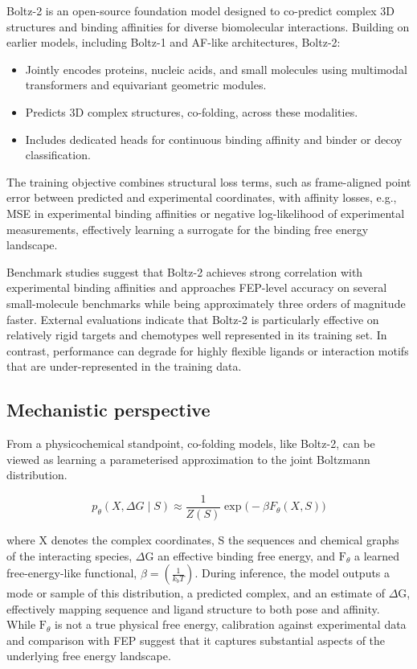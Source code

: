 \documentclass[12pt]{article}
\begin{document}
Boltz-2\cite{CH13_passaro2025boltz2} is an open-source foundation model designed to co-predict complex 3D structures and binding affinities for diverse biomolecular interactions. Building on earlier models, including Boltz-1\cite{CH13_wohlwend2025boltz} and AF-like architectures, Boltz-2:
\begin{itemize}
  \item Jointly encodes proteins, nucleic acids, and small molecules using multimodal transformers and equivariant geometric modules.
  \item Predicts 3D complex structures, co-folding, across these modalities.
  \item Includes dedicated heads for continuous binding affinity and binder or decoy classification.
\end{itemize}
The training objective combines structural loss terms, such as frame-aligned point error between predicted and experimental coordinates, with affinity losses, e.g., MSE in experimental binding affinities or negative log-likelihood of experimental measurements, effectively learning a surrogate for the binding free energy landscape.

Benchmark studies\cite{CH13_passaro2025boltz2,CH13_wan2026reliability} suggest that Boltz-2 achieves strong correlation with experimental binding affinities and approaches FEP-level accuracy on several small-molecule benchmarks while being approximately three orders of magnitude faster. External evaluations indicate that Boltz-2 is particularly effective on relatively rigid targets and chemotypes well represented in its training set. In contrast, performance can degrade for highly flexible ligands or interaction motifs that are under-represented in the training data.

\subsection{Mechanistic perspective}

From a physicochemical standpoint, co-folding models, like Boltz-2, can be viewed as learning a parameterised approximation to the joint Boltzmann distribution.

\begin{equation}
p_{\theta}(X, \Delta G \mid S) \approx \frac{1}{Z(S)} \exp\big( - \beta F_{\theta}(X, S) \big)
\end{equation}

where X denotes the complex coordinates, S the sequences and chemical graphs of the interacting species, $\Delta \textrm{G}$ an effective binding free energy, and $\textrm{F}_{\theta}$ a learned free-energy-like functional, $\beta = (\frac{1}{k_b T})$. During inference, the model outputs a mode or sample of this distribution, a predicted complex, and an estimate of $\Delta \textrm{G}$, effectively mapping sequence and ligand structure to both pose and affinity. While $\textrm{F}_{\theta}$ is not a true physical free energy, calibration against experimental data and comparison with FEP suggest that it captures substantial aspects of the underlying free energy landscape\cite{CH13_passaro2025boltz2}.
\end{document}
